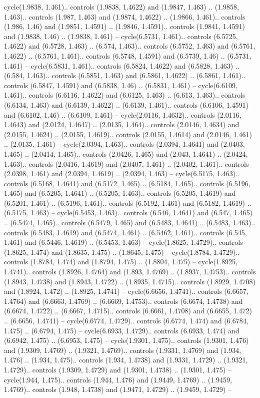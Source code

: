 cycle(1.9838, 1.461).. controls (1.9838, 1.4622) and (1.9847, 1.463) .. (1.9858, 1.463).. controls (1.987, 1.463) and (1.9874, 1.4622) .. (1.9866, 1.461).. controls (1.986, 1.46) and (1.9851, 1.4591) .. (1.9846, 1.4591).. controls (1.9841, 1.4591) and (1.9838, 1.46) .. (1.9838, 1.461) -- cycle(6.5731, 1.461).. controls (6.5725, 1.4622) and (6.5728, 1.463) .. (6.574, 1.463).. controls (6.5752, 1.463) and (6.5761, 1.4622) .. (6.5761, 1.461).. controls (6.5748, 1.4591) and (6.5739, 1.46) .. (6.5731, 1.461) -- cycle(6.5831, 1.461).. controls (6.5824, 1.4622) and (6.5828, 1.463) .. (6.584, 1.463).. controls (6.5851, 1.463) and (6.5861, 1.4622) .. (6.5861, 1.461).. controls (6.5847, 1.4591) and (6.5838, 1.46) .. (6.5831, 1.461) -- cycle(6.6109, 1.461).. controls (6.6116, 1.4622) and (6.6125, 1.463) .. (6.613, 1.463).. controls (6.6134, 1.463) and (6.6139, 1.4622) .. (6.6139, 1.461).. controls (6.6106, 1.4591) and (6.6102, 1.46) .. (6.6109, 1.461) -- cycle(2.0116, 1.4632).. controls (2.0116, 1.4643) and (2.0124, 1.4647) .. (2.0135, 1.464).. controls (2.0146, 1.4634) and (2.0155, 1.4624) .. (2.0155, 1.4619).. controls (2.0155, 1.4614) and (2.0146, 1.461) .. (2.0135, 1.461) -- cycle(2.0394, 1.463).. controls (2.0394, 1.4641) and (2.0403, 1.465) .. (2.0414, 1.465).. controls (2.0426, 1.465) and (2.043, 1.4641) .. (2.0424, 1.463).. controls (2.0416, 1.4619) and (2.0407, 1.461) .. (2.0402, 1.461).. controls (2.0398, 1.461) and (2.0394, 1.4619) .. (2.0394, 1.463) -- cycle(6.5175, 1.463).. controls (6.5168, 1.4641) and (6.5172, 1.465) .. (6.5184, 1.465).. controls (6.5196, 1.465) and (6.5205, 1.4641) .. (6.5205, 1.463).. controls (6.5205, 1.4619) and (6.5201, 1.461) .. (6.5196, 1.461).. controls (6.5192, 1.461) and (6.5182, 1.4619) .. (6.5175, 1.463) -- cycle(6.5453, 1.463).. controls (6.546, 1.4641) and (6.547, 1.465) .. (6.5474, 1.465).. controls (6.5479, 1.465) and (6.5483, 1.4641) .. (6.5483, 1.463).. controls (6.5483, 1.4619) and (6.5474, 1.461) .. (6.5462, 1.461).. controls (6.545, 1.461) and (6.5446, 1.4619) .. (6.5453, 1.463) -- cycle(1.8625, 1.4729).. controls (1.8625, 1.474) and (1.8635, 1.475) .. (1.8645, 1.475) -- cycle(1.8784, 1.4729).. controls (1.8784, 1.474) and (1.8794, 1.475) .. (1.8804, 1.475) -- cycle(1.8925, 1.4741).. controls (1.8926, 1.4764) and (1.893, 1.4769) .. (1.8937, 1.4753).. controls (1.8943, 1.4738) and (1.8943, 1.4722) .. (1.8935, 1.4715).. controls (1.8929, 1.4708) and (1.8924, 1.472) .. (1.8925, 1.4741) -- cycle(6.6656, 1.4741).. controls (6.6657, 1.4764) and (6.6663, 1.4769) .. (6.6669, 1.4753).. controls (6.6674, 1.4738) and (6.6674, 1.4722) .. (6.6667, 1.4715).. controls (6.6661, 1.4708) and (6.6655, 1.472) .. (6.6656, 1.4741) -- cycle(6.6774, 1.4729).. controls (6.6774, 1.474) and (6.6784, 1.475) .. (6.6794, 1.475) -- cycle(6.6933, 1.4729).. controls (6.6933, 1.474) and (6.6942, 1.475) .. (6.6953, 1.475) -- cycle(1.9301, 1.475).. controls (1.9301, 1.476) and (1.9309, 1.4769) .. (1.9321, 1.4769).. controls (1.9331, 1.4769) and (1.934, 1.476) .. (1.934, 1.475).. controls (1.934, 1.4738) and (1.9331, 1.4729) .. (1.9321, 1.4729).. controls (1.9309, 1.4729) and (1.9301, 1.4738) .. (1.9301, 1.475) -- cycle(1.944, 1.475).. controls (1.944, 1.476) and (1.9449, 1.4769) .. (1.9459, 1.4769).. controls (1.948, 1.4738) and (1.9471, 1.4729) .. (1.9459, 1.4729) -- 